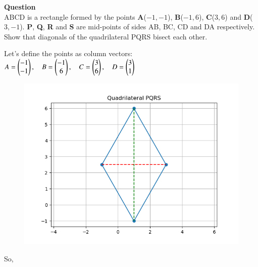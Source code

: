 \documentclass{article}
\begin{document}
\textbf{Question}\\
ABCD is a rectangle formed by the points \textbf{A}($-1,-1$), \textbf{B}($-1,6$), \textbf{C}($3,6$) and \textbf{D}($3,-1$). \textbf{P}, \textbf{Q}, \textbf{R} and \textbf{S} are mid-points of sides AB, BC, CD and DA respectively. Show that diagonals of the quadrilateral PQRS bisect each other.

\vspace{1cm}
Let’s define the points as column vectors:\\
    \vspace{0.5cm}
    $\begin{aligned}
    A = \myvec{-1 \\ -1}, \quad 
    B = \myvec{-1 \\ 6}, \quad 
    C = \myvec{3 \\ 6}, \quad 
    D = \myvec{3 \\ 1} 
    \end{aligned}$
\begin{center}
    \begin{figure}[H]
        \centering
        \includegraphics[width=0.5\linewidth]{figs/Figure_1.png}
        \caption{}
        \label{fig:1}
    \end{figure}
\end{center}
    


So,
\end{document}
